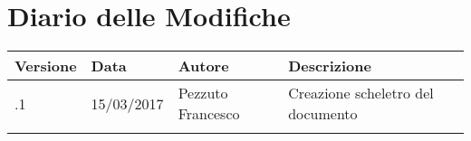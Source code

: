 \section*{Diario delle Modifiche}
\begin{longtabu} to \textwidth {
	X[4,l,p]
	X[4,l,p]
	X[4,l,p]
	X[8,l,p]}
	\toprule
		 Versione & Data & Autore & Descrizione \\
		\midrule
		\endhead
		
		\addlinespace[0.2em]
		\midrule
		.1 & 15/03/2017 & Pezzuto Francesco & Creazione scheletro del documento\\
		\addlinespace[0.4em]
		
	\bottomrule
\end{longtabu}